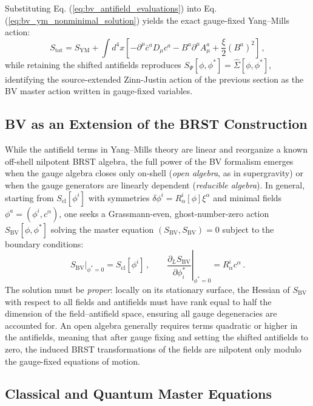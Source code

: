 Substituting Eq. (\ref{eq:bv_antifield_evaluations}) into Eq. (\ref{eq:bv_ym_nonminimal_solution}) yields the exact gauge-fixed Yang--Mills action:
\begin{equation} \label{eq:bv_ym_total_action_recovered}
    S_{\text{tot}} = S_{\text{YM}} + \int d^4x \left[ -\partial^\mu \bar{c}^a D_\mu c^a - B^a \partial^\mu A_\mu^a + \frac{\xi}{2}(B^a)^2 \right] \, ,
\end{equation}
while retaining the shifted antifields reproduces \(S_\Psi[\phi, \phi^*] = \widehat{\Sigma}[\phi, \phi^*]\), identifying the source-extended Zinn-Justin action of the previous section as the BV master action written in gauge-fixed variables.

\subsection{BV as an Extension of the BRST Construction}

While the antifield terms in Yang--Mills theory are linear and reorganize a known off-shell nilpotent BRST algebra, the full power of the BV formalism emerges when the gauge algebra closes only on-shell (\textit{open algebra}, as in supergravity) or when the gauge generators are linearly dependent (\textit{reducible algebra}). In general, starting from \(S_{\text{cl}}[\phi^i]\) with symmetries \(\delta \phi^i = R^i_\alpha[\phi]\xi^\alpha\) and minimal fields \(\phi^a = (\phi^i, c^\alpha)\), one seeks a Grassmann-even, ghost-number-zero action \(S_{\text{BV}}[\phi, \phi^*]\) solving the master equation \((S_{\text{BV}}, S_{\text{BV}}) = 0\) subject to the boundary conditions:
\begin{equation} \label{eq:bv_boundary_conditions}
    \left. S_{\text{BV}} \right|_{\phi^* = 0} = S_{\text{cl}}[\phi^i] \, , \qquad \left. \frac{\partial_L S_{\text{BV}}}{\partial \phi_i^*} \right|_{\phi^* = 0} = R^i_\alpha c^\alpha \, .
\end{equation}
The solution must be \textit{proper}: locally on its stationary surface, the Hessian of \(S_{\text{BV}}\) with respect to all fields and antifields must have rank equal to half the dimension of the field--antifield space, ensuring all gauge degeneracies are accounted for. An open algebra generally requires terms quadratic or higher in the antifields, meaning that after gauge fixing and setting the shifted antifields to zero, the induced BRST transformations of the fields are nilpotent only modulo the gauge-fixed equations of motion.

\subsection{Classical and Quantum Master Equations}

